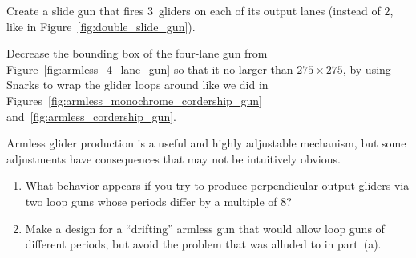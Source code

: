 \begin{multicols}{2}
	
	\mfilbreak
	
	
	\begin{problem}\label{exer:triple_slide_gun} 
		Create a slide gun that fires $3$~gliders on each of its output lanes (instead of $2$, like in Figure~\ref{fig:double_slide_gun}).
		
	\end{problem}


	\mfilbreak
	
	
	\begin{problem}\label{exer:four_lane_gun_smaller} 
		Decrease the bounding box of the four-lane gun from Figure~\ref{fig:armless_4_lane_gun} so that it no larger than $275 \times 275$, by using Snarks to wrap the glider loops around like we did in Figures~\ref{fig:armless_monochrome_cordership_gun} and~\ref{fig:armless_cordership_gun}.
	\end{problem}
	
	
	\mfilbreak
	
	
	\begin{problem}\label{exer:armless_basics}
		Armless glider production is a useful and highly adjustable mechanism, but some adjustments have consequences that may not be intuitively obvious.\smallskip
		
		\begin{enumerate}[label=\bf\color{ocre}(\alph*)]
			\item {} What behavior appears if you try to produce perpendicular output gliders via two loop guns whose periods differ by a multiple of 8?
			
			\item {} Make a design for a ``drifting'' armless gun that would allow loop guns of different periods, but avoid the problem that was alluded to in part~(a).
		\end{enumerate}
	\end{problem}
	

\end{multicols}
